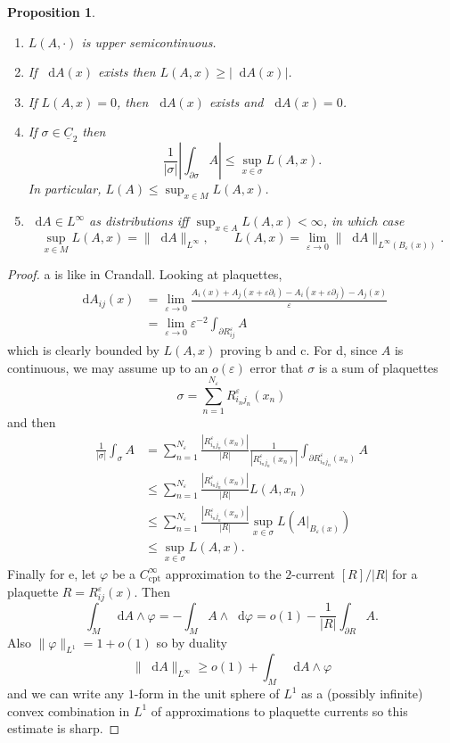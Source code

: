 \documentclass[reqno,11pt]{amsart}
\newcommand*\dif{\mathop{}\!\mathrm{d}}
\newcommand{\Chain}{\underline C}
\newcommand{\cpt}{\mathrm{cpt}}
\newtheorem{proposition}[theorem]{Proposition}
\theoremstyle{definition}
\numberwithin{equation}{section}
\begin{document}
\begin{proposition}
\begin{enumerate}
\item $L(A, \cdot)$ is upper semicontinuous.
\item If $\dif A(x)$ exists then $L(A, x) \geq |\dif A(x)|$.
\item If $L(A, x) = 0$, then $\dif A(x)$ exists and $\dif A(x) = 0$.
\item If $\sigma \in \Chain_2$ then 
$$\frac{1}{|\sigma|} \left|\int_{\partial \sigma} A\right| \leq \sup_{x \in \sigma} L(A, x).$$
In particular, $L(A) \leq \sup_{x \in M} L(A, x)$.
\item $\dif A \in L^\infty$ as distributions iff $\sup_{x \in A} L(A, x) < \infty$, in which case 
$$\sup_{x \in M} L(A, x) = \|\dif A\|_{L^\infty}, \qquad L(A, x) = \lim_{\varepsilon \to 0} \|\dif A\|_{L^\infty(B_\varepsilon(x))}.$$
\end{enumerate}
\end{proposition}
\begin{proof}
a is like in Crandall. Looking at plaquettes,
\begin{align*}
\dif A_{ij}(x) 
&= \lim_{\varepsilon \to 0} \frac{A_i(x) + A_j(x + \varepsilon \partial_i) - A_i(x + \varepsilon \partial_j) - A_j(x)}{\varepsilon} \\
&= \lim_{\varepsilon \to 0} \varepsilon^{-2} \int_{\partial R_{ij}^\varepsilon} A
\end{align*}
which is clearly bounded by $L(A, x)$ proving b and c.
For d, since $A$ is continuous, we may assume up to an $o(\varepsilon)$ error that $\sigma$ is a sum of plaquettes 
$$\sigma = \sum_{n = 1}^{N_\varepsilon} R_{i_n j_n}^\varepsilon(x_n)$$
and then 
\begin{align*}
\frac{1}{|\sigma|} \int_\sigma A
&= \sum_{n = 1}^{N_\varepsilon} \frac{|R_{i_n j_n}^\varepsilon(x_n)|}{|R|} \frac{1}{|R_{i_n j_n}^\varepsilon(x_n)|} \int_{\partial R_{i_n j_n}^\varepsilon(x_n)} A \\
&\leq \sum_{n = 1}^{N_\varepsilon} \frac{|R_{i_n j_n}^\varepsilon(x_n)|}{|R|} L(A, x_n) \\
&\leq \sum_{n = 1}^{N_\varepsilon} \frac{|R_{i_n j_n}^\varepsilon(x_n)|}{|R|} \sup_{x \in \sigma} L(A|_{B_\varepsilon(x)}) \\
&\leq \sup_{x \in \sigma} L(A, x).
\end{align*}
Finally for e, let $\varphi$ be a $C^\infty_\cpt$ approximation to the $2$-current $[R]/|R|$ for a plaquette $R = R_{ij}^\varepsilon(x)$. Then 
$$\int_M \dif A \wedge \varphi = - \int_M A \wedge \dif \varphi = o(1) - \frac{1}{|R|} \int_{\partial R} A.$$
Also $\|\varphi\|_{L^1} = 1 + o(1)$ so by duality 
$$\|\dif A\|_{L^\infty} \geq o(1) + \int_M \dif A \wedge \varphi$$
and we can write any $1$-form in the unit sphere of $L^1$ as a (possibly infinite) convex combination in $L^1$ of approximations to plaquette currents so this estimate is sharp.
\end{proof}
\end{document}
